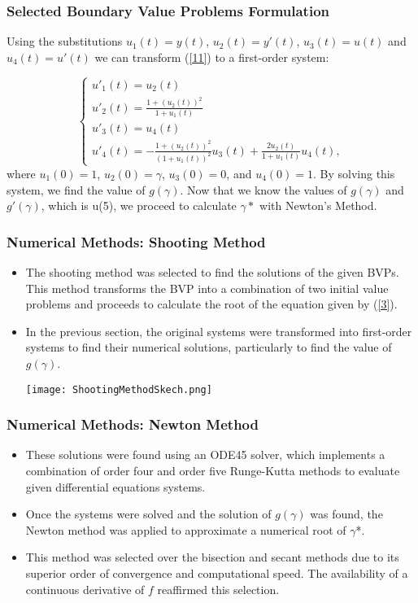 \documentclass{beamer}
\begin{document}
\begin{frame}
\frametitle{Selected Boundary Value Problems Formulation} %
Using the substitutions $u_1(t)=y(t)$, $u_2(t)=y'(t)$, $u_3(t)=u(t)$ and $u_4(t)=u'(t)$ we can transform (\ref{11}) to a first-order system:

\begin{equation}\label{14}
    \begin{cases}
        u'_1(t)=u_2(t)\\
        u'_2(t)=\frac{1+(u_2(t))^2}{1+u_1(t)}\\
        u'_3(t)=u_4(t)\\
        u'_4(t)=-\frac{1+(u_2(t))^2}{(1+u_1(t))^2}u_3(t)+\frac{2u_2(t)}{1+u_1(t)}u_4(t),
    \end{cases}
\end{equation}
where $u_1(0)=1$, $u_2(0)=\gamma$, $u_3(0)=0$, and $u_4(0)=1$. By solving this system, we find the value of $g(\gamma)$. Now that we know the values of $g(\gamma)$ and $g'(\gamma)$, which is u(5), we proceed to calculate $\gamma*$ with Newton's Method.
    
\end{frame}

\begin{frame}
\frametitle{Numerical Methods: Shooting Method}
\begin{itemize}
    \item The shooting method was selected to find the solutions of the given BVPs. This method transforms the BVP into a combination of two initial value problems and proceeds to calculate the root of the equation given by (\ref{3}).
    \item In the previous section, the original systems were transformed into first-order systems to find their numerical solutions, particularly to find the value of $g(\gamma)$.
    \begin{center}
    \texttt{[image: ShootingMethodSkech.png]}
    \end{center}
\end{itemize}
\end{frame}

\begin{frame}
\frametitle{Numerical Methods: Newton Method}
\begin{itemize}
    \item These solutions were found using an ODE45 solver, which implements a combination of order four and order five Runge-Kutta methods to evaluate given differential equations systems.
    \item Once the systems were solved and the solution of $g(\gamma)$ was found, the Newton method was applied to approximate a numerical root of $\gamma$*.
    \item This method was selected over the bisection and secant methods due to its superior order of convergence and computational speed. The availability of a continuous derivative of $f$ reaffirmed this selection.
\end{itemize}
\end{frame}
\end{document}
